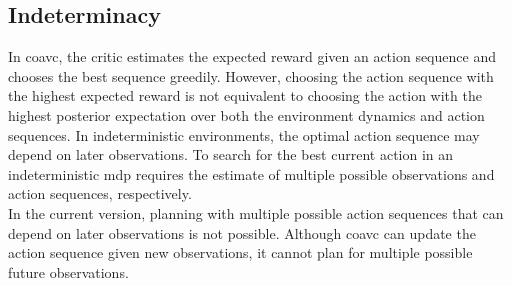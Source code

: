 \subsection{Indeterminacy}
In \ac{coavc}, the critic estimates the expected reward given an action sequence and chooses the best sequence greedily. 
However, choosing the action sequence with the highest expected reward is not equivalent to choosing the action with the highest posterior 
expectation over both the environment dynamics and action sequences. In indeterministic environments, the optimal action sequence may depend on later observations. To 
search for the best current action in an indeterministic \ac{mdp} requires the estimate of multiple possible observations and action sequences, respectively. \\

In the current version, planning with multiple possible action sequences that can depend on later observations is not possible. 
Although \ac{coavc} can update the action sequence given new observations, it cannot plan for multiple possible future observations.